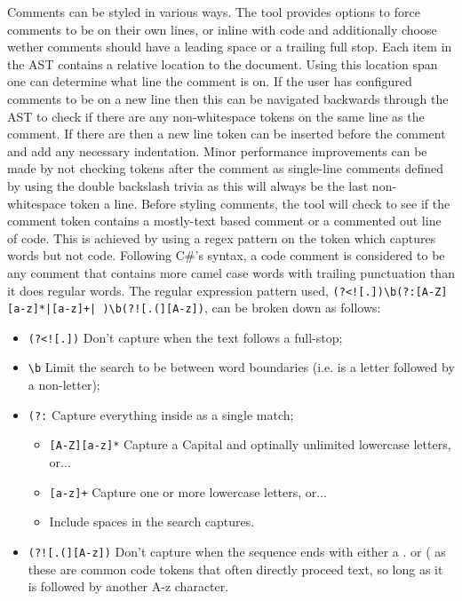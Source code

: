 Comments can be styled in various ways. The tool provides options to force comments to be on their own lines, or inline with code and additionally choose wether comments should have a leading space or a trailing full stop. Each item in the AST contains a relative location to the document. Using this location span one can determine what line the comment is on. If the user has configured comments to be on a new line then this can be navigated backwards through the AST to check if there are any non-whitespace tokens on the same line as the comment. If there are then a new line token can be inserted before the comment and add any necessary indentation. Minor performance improvements can be made by not checking tokens after the comment as single-line comments defined by using the double backslash trivia as this will always be the last non-whitespace token a line.
Before styling comments, the tool will check to see if the comment token contains a mostly-text based comment or a commented out line of code. This is achieved by using a regex pattern on the token which captures words but not code. Following C\#'s syntax, a code comment is considered to be any comment that contains more camel case words with trailing punctuation than it does regular words. The regular expression pattern used, \texttt{(?<![.])\textbackslash b(?:[A-Z][a-z]*|[a-z]+| )\textbackslash b(?![.(][A-z])}, can be broken down as follows:
\begin{itemize}
    \item \texttt{(?<![.])} Don't capture when the text follows a full-stop;
    \item \texttt{\textbackslash b} Limit the search to be between word boundaries (i.e. is a letter followed by a non-letter);
    \item \texttt{(?:} Capture everything inside as a single match;
    \begin{itemize}
        \item \texttt{[A-Z][a-z]*} Capture a Capital and optinally unlimited lowercase letters, or...
        \item \texttt{[a-z]+} Capture one or more lowercase letters, or...
        \item Include spaces in the search captures.
    \end{itemize}
    \item \texttt{(?![.(][A-z])} Don't capture when the sequence ends with either a . or ( as these are common code tokens that often directly proceed text, so long as it is followed by another A-z character.
\end{itemize}

